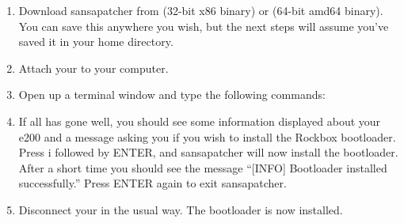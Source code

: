 \begin{enumerate}

\item Download sansapatcher from
 (32-bit x86 
binary) or  
(64-bit amd64 binary). You can save this anywhere you wish, but the next 
steps will assume you've saved it in your home directory.

\item Attach your \dap{} to your computer.

\item Open up a terminal window and type the following commands:



\item If all has gone well, you should see some information displayed about
your e200 and a message asking you if you wish to install the Rockbox
bootloader. Press i followed by ENTER, and sansapatcher will now install the
bootloader. After a short time you should see the message ``[INFO] Bootloader
installed successfully.'' Press ENTER again to exit sansapatcher.

\item Disconnect your \dap{} in the usual way. The bootloader is now installed.

\end{enumerate}
